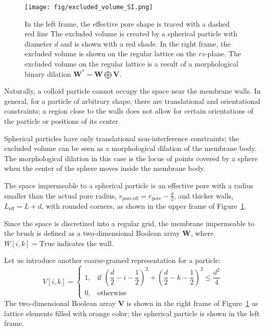 \documentclass[10pt, a4paper]{article}
\begin{document}
\begin{multicols}{2}

\begin{figure}[H]
    \centering
    \texttt{[image: fig/excluded\_volume\_SI.png]}
    \caption{
        In the left frame, the effective pore shape is traced with a dashed red line
        The excluded volume is created by a spherical particle with diameter $d$ and is shown with a red shade.
        In the right frame, the excluded volume is shown on the regular lattice on the $rz$-plane.
        The excluded volume on the regular lattice is a result of a morphological binary dilation $\bm{W}^{\ast} = \bm{W} \bigoplus \bm{V}$.
        }
    \label{fig:excluded_volume}
\end{figure}

Naturally, a colloid particle cannot occupy the space near the membrane walls.
In general, for a particle of arbitrary shape, there are translational and orientational constraints; a region close to the walls does not allow for certain orientations of the particle or positions of its center.

Spherical particles have only translational non-interference constraints; the excluded volume can be seen as a morphological dilation of the membrane body.
The morphological dilation in this case is the locus of points covered by a sphere when the center of the sphere moves inside the membrane body.

The space impermeable to a spherical particle is an effective pore with a radius smaller than the actual pore radius, $r_{\textrm{pore,eff}} = r_{\textrm{pore}} - \frac{d}{2}$, and thicker walls, $L_{\textrm{eff}} = L + d$, with rounded corners, as shown in the upper frame of Figure~\ref{fig:excluded_volume}.

Since the space is discretized into a regular grid, the membrane impermeable to the brush is defined as a two-dimensional Boolean array $\bm{W}$, where $W[i, k] = \textrm{True}$ indicates the wall.

Let us introduce another coarse-grained representation for a particle:
\begin{equation}
    V[i, k] = 
    \begin{cases}
            1, & \text{if } \left( \dfrac{d}{2} - i - \dfrac{1}{2} \right)^2 + \left( \dfrac{d}{2} - k - \dfrac{1}{2} \right)^2 \le \dfrac{d^2}{4} \\
            0, & \text{otherwise}
        \end{cases}
\end{equation}
The two-dimensional Boolean array $\bm{V}$ is shown in the right frame of Figure~\ref{fig:excluded_volume} as lattice elements filled with orange color; the spherical particle is shown in the left frame.


\end{multicols}
\end{document}
